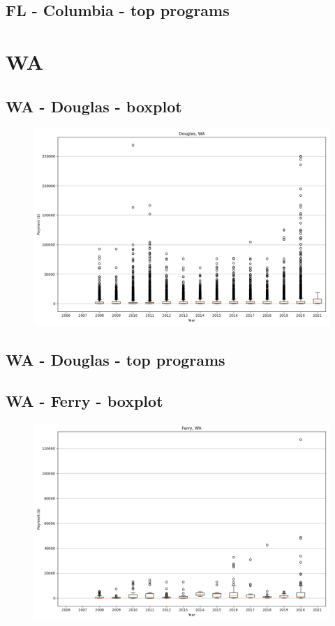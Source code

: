 \subsection*{FL - Columbia - top programs}

\newpage
\section*{WA}
\subsection*{WA - Douglas - boxplot}
\begin{figure}[h]
\centering
\includegraphics[width=7in]{../output/boxplots/counties/Douglas-WA_boxplot.png}
\end{figure}


\subsection*{WA - Douglas - top programs}

\newpage
\subsection*{WA - Ferry - boxplot}
\begin{figure}[h]
\centering
\includegraphics[width=7in]{../output/boxplots/counties/Ferry-WA_boxplot.png}
\end{figure}


